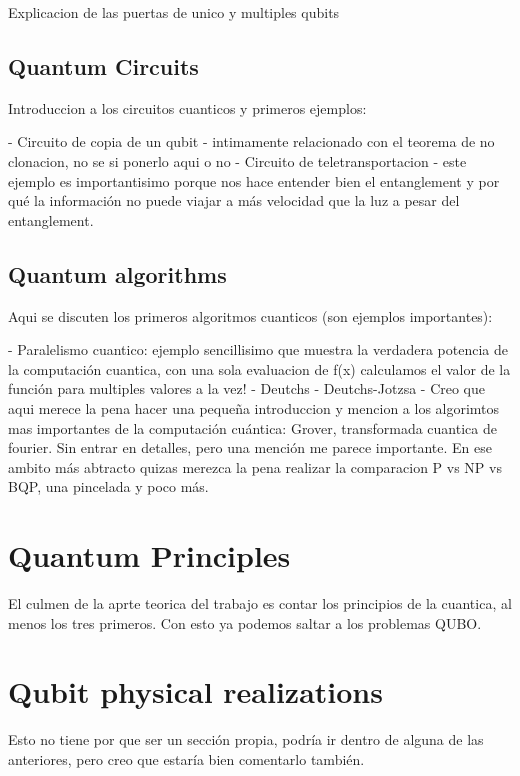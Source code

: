 Explicacion de las puertas de unico y multiples qubits

\subsection{Quantum Circuits}

Introduccion a los circuitos cuanticos y primeros ejemplos:

- Circuito de copia de un qubit - intimamente relacionado con el teorema de no clonacion, no se si ponerlo aqui o no
- Circuito de teletransportacion - este ejemplo es importantisimo porque nos hace entender bien el entanglement y por qué la información no puede viajar a más velocidad que la luz a pesar del entanglement.

\subsection{Quantum algorithms}

Aqui se discuten los primeros algoritmos cuanticos (son ejemplos importantes):

- Paralelismo cuantico: ejemplo sencillisimo que muestra la verdadera potencia de la computación cuantica, con una sola evaluacion de f(x) calculamos el valor de la función para multiples valores a la vez!
- Deutchs
- Deutchs-Jotzsa
- Creo que aqui merece la pena hacer una pequeña introduccion y mencion a los algorimtos mas importantes de la computación cuántica: Grover, transformada cuantica de fourier. Sin entrar en detalles, pero una mención me parece importante. En ese ambito más abtracto quizas merezca la pena realizar la comparacion P vs NP vs BQP, una pincelada y poco más.


\section{Quantum Principles}

El culmen de la aprte teorica del trabajo es contar los principios de la cuantica, al menos los tres primeros. Con esto ya podemos saltar a los problemas QUBO.

\section{Qubit physical realizations}

Esto no tiene por que ser un sección propia, podría ir dentro de alguna de las anteriores, pero creo que estaría bien comentarlo también.


